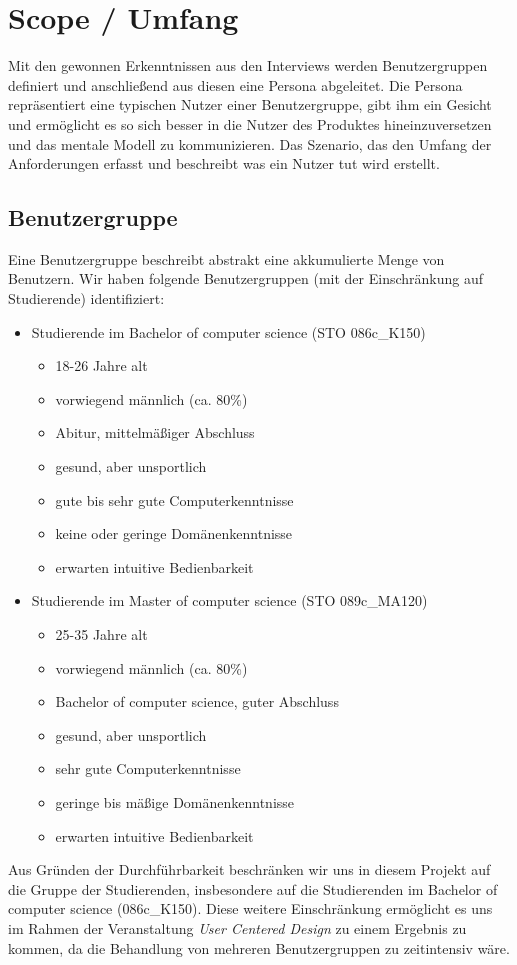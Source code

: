 \documentclass{article}
\begin{document}
\newpage

\section{Scope / Umfang}

Mit den gewonnen Erkenntnissen aus den Interviews werden Benutzergruppen definiert und anschließend aus diesen eine Persona abgeleitet. Die Persona repräsentiert eine typischen Nutzer einer Benutzergruppe, gibt ihm ein Gesicht und ermöglicht es so sich besser in die Nutzer des Produktes hineinzuversetzen und das mentale Modell zu kommunizieren. Das Szenario, das den Umfang der Anforderungen erfasst und beschreibt was ein Nutzer tut wird erstellt. 

\subsection{Benutzergruppe}

Eine Benutzergruppe beschreibt abstrakt eine akkumulierte Menge von Benutzern. Wir haben folgende Benutzergruppen (mit der Einschränkung auf Studierende) identifiziert:
\begin{itemize}
\item Studierende im Bachelor of computer science (STO 086c\_K150)
	\begin{itemize}
	\item 18-26 Jahre alt
	\item vorwiegend männlich (ca. 80\%)
	\item Abitur, mittelmäßiger Abschluss
	\item gesund, aber unsportlich
	\item gute bis sehr gute Computerkenntnisse
	\item keine oder geringe Domänenkenntnisse
	\item erwarten intuitive Bedienbarkeit
	\end{itemize}
\item Studierende im Master of computer science (STO 089c\_MA120)
	\begin{itemize}
	\item 25-35 Jahre alt
	\item vorwiegend männlich (ca. 80\%)
	\item Bachelor of computer science, guter Abschluss
	\item gesund, aber unsportlich
	\item sehr gute Computerkenntnisse
	\item geringe bis mäßige Domänenkenntnisse
	\item erwarten intuitive Bedienbarkeit
	\end{itemize}
\end{itemize}
Aus Gründen der Durchführbarkeit beschränken wir uns in diesem Projekt auf die Gruppe
der Studierenden, insbesondere auf die Studierenden im Bachelor of computer science (086c\_K150). Diese weitere Einschränkung ermöglicht es uns im Rahmen der Veranstaltung \textit{User Centered Design} zu einem Ergebnis zu kommen, da die Behandlung von mehreren Benutzergruppen zu zeitintensiv wäre.
\end{document}
